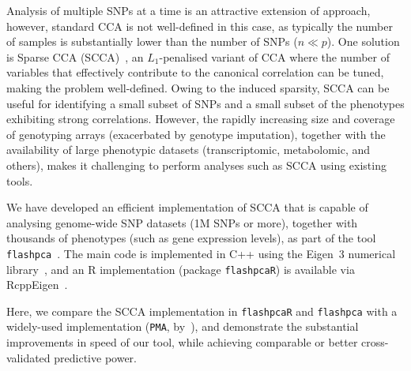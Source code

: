 \documentclass{bioinfo}
\begin{document}
Analysis of multiple SNPs at a time is an attractive extension of approach,
however, standard CCA is not well-defined in this case, as typically the number
of samples is substantially lower than the number of SNPs ($n{\ll}p$).  One
solution is Sparse CCA (SCCA)~\citep{Witten2009b,Witten2009c,Parkhomenko2009},
an $L_1$-penalised variant of CCA where the number of variables that effectively
contribute to the canonical correlation can be tuned, making the problem
well-defined. Owing to the induced sparsity, SCCA can be useful for identifying
a small subset of SNPs and a small subset of the phenotypes exhibiting strong
correlations.  However, the rapidly increasing size and coverage of genotyping
arrays (exacerbated by genotype imputation), together with the availability of
large phenotypic datasets (transcriptomic, metabolomic, and others), makes it
challenging to perform analyses such as SCCA using existing tools.

We have developed an efficient implementation of SCCA that is capable of
analysing genome-wide SNP datasets (1M SNPs or more), together with thousands of
phenotypes (such as gene expression levels), as part of the tool
\texttt{flashpca}~\citep{Abraham2014}. The main code is implemented in
\textsf{C++} using the Eigen~3 numerical library~\citep{eigenweb}, and an
\textsf{R} implementation (package \texttt{flashpcaR}) is available via
RcppEigen~\citep{Bates2013}.

Here, we compare the SCCA implementation in \texttt{flashpcaR} and
\texttt{flashpca} with a widely-used implementation (\texttt{PMA},
by~\citet{Witten2013}), and demonstrate the substantial improvements in speed of
our tool, while achieving comparable or better cross-validated predictive power.
\end{document}

